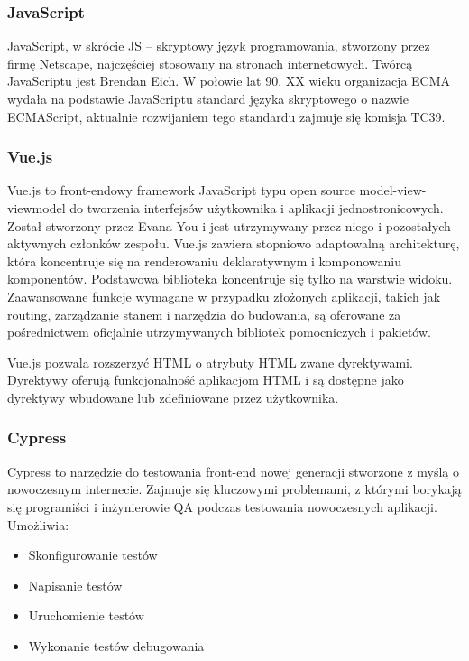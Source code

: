 \documentclass[12pt,a4paper]{article}
\begin{document}
		\subsubsection{JavaScript}
		JavaScript, w skrócie JS – skryptowy język programowania, stworzony przez firmę Netscape, najczęściej stosowany na stronach internetowych. Twórcą JavaScriptu jest Brendan Eich. W połowie lat 90. XX wieku organizacja ECMA wydała na podstawie JavaScriptu standard języka skryptowego o nazwie ECMAScript, aktualnie rozwijaniem tego standardu zajmuje się komisja TC39.
		\subsubsection{Vue.js}
		Vue.js to front-endowy framework JavaScript typu open source model-view-viewmodel do tworzenia interfejsów użytkownika i aplikacji jednostronicowych. Został stworzony przez Evana You i jest utrzymywany przez niego i pozostałych aktywnych członków zespołu.
		Vue.js zawiera stopniowo adaptowalną architekturę, która koncentruje się na renderowaniu deklaratywnym i komponowaniu komponentów. Podstawowa biblioteka koncentruje się tylko na warstwie widoku. Zaawansowane funkcje wymagane w przypadku złożonych aplikacji, takich jak routing, zarządzanie stanem i narzędzia do budowania, są oferowane za pośrednictwem oficjalnie utrzymywanych bibliotek pomocniczych i pakietów.

Vue.js pozwala rozszerzyć HTML o atrybuty HTML zwane dyrektywami. Dyrektywy oferują funkcjonalność aplikacjom HTML i są dostępne jako dyrektywy wbudowane lub zdefiniowane przez użytkownika. 
		\subsubsection{Cypress}
		Cypress to narzędzie do testowania front-end nowej generacji stworzone z myślą o nowoczesnym internecie. Zajmuje się kluczowymi problemami, z którymi borykają się programiści i inżynierowie QA podczas testowania nowoczesnych aplikacji.
\newline
\newline
Umożliwia:
\begin{itemize}
\item Skonfigurowanie testów
\item Napisanie testów
\item Uruchomienie testów
\item Wykonanie testów debugowania
\end{itemize}
\end{document}
